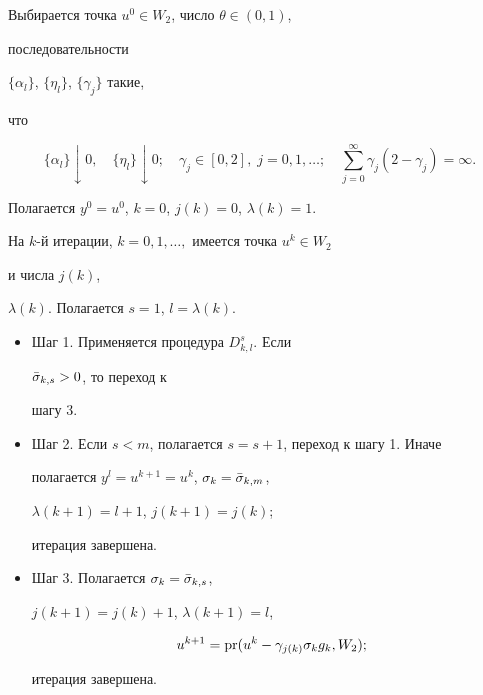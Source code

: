 \begin{meths}


Выбирается точка $u^0\in W_2$, число $\theta\in(0,1)$,


последовательности


$\{\alpha_l\}$, $\{\eta_l\}$, $\{\gamma_j\}$ такие,


что


$$


\{\alpha_l\}\downarrow 0,\quad \{\eta_l\}\downarrow 0;\quad


\gamma_j\in[0,2],\;j=0,1,\dotsc;\quad


\sum^\infty_{j=0}\gamma_j(2-\gamma_j)=\infty.


$$


Полагается $y^0=u^0$, $k=0$, $j(k)=0$, $\lambda(k)=1$.





На $k$-й итерации, $k=0,1,\dotsc,$ имеется точка $u^k\in W_2$


и числа $j(k)$,


$\lambda(k)$. Полагается $s=1$, $l=\lambda(k)$.


\begin{itemize}


\item[\ ]Шаг 1. Применяется процедура $D^s_{k,l}$. Если


$\Bar\sigma_{k,s}>0$, то переход к


шагу 3.


\item[\ ]Шаг 2. Если $s<m$, полагается $s=s+1$, переход к шагу 1. Иначе


полагается $y^l=u^{k+1}=u^k$, $\sigma_k=\Bar\sigma_{k,m}$,


$\lambda(k+1)=l+1$, $j(k+1)=j(k)$;


итерация завершена.


\item[\ ]Шаг 3. Полагается $\sigma_k=\Bar\sigma_{k,s}$,


$j(k+1)=j(k)+1$, $\lambda(k+1)=l$,


\begin{equation}


u^{k+1}=\pr(u^k-\gamma_{j(k)}\sigma_kg_k,W_2);


\end{equation}


итерация завершена.


\end{itemize}


\end{meths}





